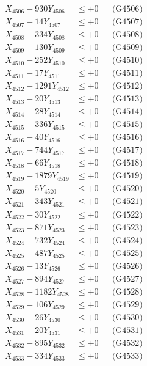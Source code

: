 \documentclass[a4paper,10pt]{article}
\begin{document}
{\begin{align}
X_{4506} - 930Y_{4506} &\leq +0 && \text{(G4506)} \\
X_{4507} - 14Y_{4507} &\leq +0 && \text{(G4507)} \\
X_{4508} - 334Y_{4508} &\leq +0 && \text{(G4508)} \\
X_{4509} - 130Y_{4509} &\leq +0 && \text{(G4509)} \\
X_{4510} - 252Y_{4510} &\leq +0 && \text{(G4510)} \\
\allowbreak
X_{4511} - 17Y_{4511} &\leq +0 && \text{(G4511)} \\
X_{4512} - 1291Y_{4512} &\leq +0 && \text{(G4512)} \\
X_{4513} - 20Y_{4513} &\leq +0 && \text{(G4513)} \\
X_{4514} - 28Y_{4514} &\leq +0 && \text{(G4514)} \\
X_{4515} - 336Y_{4515} &\leq +0 && \text{(G4515)} \\
X_{4516} - 40Y_{4516} &\leq +0 && \text{(G4516)} \\
X_{4517} - 744Y_{4517} &\leq +0 && \text{(G4517)} \\
X_{4518} - 66Y_{4518} &\leq +0 && \text{(G4518)} \\
X_{4519} - 1879Y_{4519} &\leq +0 && \text{(G4519)} \\
X_{4520} - 5Y_{4520} &\leq +0 && \text{(G4520)} \\
\allowbreak
X_{4521} - 343Y_{4521} &\leq +0 && \text{(G4521)} \\
X_{4522} - 30Y_{4522} &\leq +0 && \text{(G4522)} \\
X_{4523} - 871Y_{4523} &\leq +0 && \text{(G4523)} \\
X_{4524} - 732Y_{4524} &\leq +0 && \text{(G4524)} \\
X_{4525} - 487Y_{4525} &\leq +0 && \text{(G4525)} \\
X_{4526} - 13Y_{4526} &\leq +0 && \text{(G4526)} \\
X_{4527} - 894Y_{4527} &\leq +0 && \text{(G4527)} \\
X_{4528} - 1182Y_{4528} &\leq +0 && \text{(G4528)} \\
X_{4529} - 106Y_{4529} &\leq +0 && \text{(G4529)} \\
X_{4530} - 26Y_{4530} &\leq +0 && \text{(G4530)} \\
\allowbreak
X_{4531} - 20Y_{4531} &\leq +0 && \text{(G4531)} \\
X_{4532} - 895Y_{4532} &\leq +0 && \text{(G4532)} \\
X_{4533} - 334Y_{4533} &\leq +0 && \text{(G4533)} \\

\end{align}}
\end{document}
